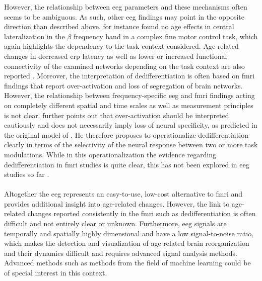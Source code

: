 However, the relationship between \gls{eeg} parameters and these mechanisms often seems to be ambiguous. As such, other \gls{eeg} findings may point in the opposite direction than described above. \citeauthor{HUBNER2018104}\cite{HUBNER2018104} for instance found no age effects in central lateralization in the $\beta$ frequency band in a complex fine motor control task, which again highlights the dependency to the task context considered. Age-related changes in decreased \gls{erp} latency as well as lower or increased functional connectivity of the examined networks depending on the task context are also reported \cite{Courtney2021}. Moreover, the interpretation of dedifferentiation is often based on \gls{fmri} findings that report over-activation and loss of segregation of brain networks. However, the relationship between frequency-specific \gls{eeg} and \gls{fmri} findings acting on completely different spatial and time scales as well as measurement principles is not clear. \citeauthor{Koen2019} \cite{Koen2019} further points out that over-activation should be interpreted cautiously and does not necessarily imply loss of neural specificity, as predicted in the original model of \citeauthor{Li2000}\cite{Li2000}. He therefore proposes to operationalize dedifferentiation clearly in terms of the selectivity of the neural response between two or more task modulations. While in this operationalization the evidence regarding dedifferentiation in \gls{fmri} studies is quite clear, this has not been explored in \gls{eeg} studies so far \cite{Koen2019}.\\
\\
Altogether the \gls{eeg} represents an easy-to-use, low-cost alternative to \gls{fmri} and provides additional insight into age-related changes. However, the link to age-related changes reported consistently in the \gls{fmri} such as dedifferentiation is often difficult and not entirely clear or unknown. Furthermore, \gls{eeg} signals are temporally and spatially highly dimensional and have a low signal-to-noise ratio, which makes the detection and visualization of age related brain reorganization and their dynamics difficult and requires advanced signal analysis methods. Advanced methods such as methods from the field of machine learning could be of special interest in this context.